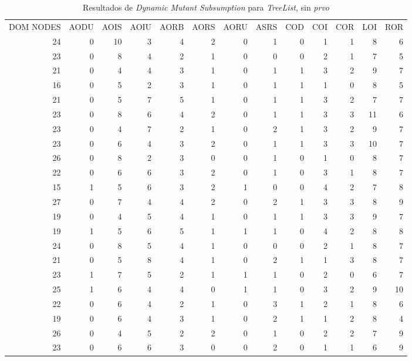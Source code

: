 \begin{table}[]
	\caption{Resultados de \emph{Dynamic Mutant Subsumption} para \emph{TreeList}, sin \emph{prvo}}
	\label{tables.results.subsumption.treelist.noprvo}
	\centering
	\scriptsize
	\def\arraystretch{0.95}
	\setlength\tabcolsep{0.5mm}
	\begin{tabular}{rrrrrrrrrrrrr}
		DOM NODES & AODU & AOIS & AOIU & AORB & AORS & AORU & ASRS & COD & COI & COR & LOI & ROR \\
		24 & 0 & 10 & 3 & 4 & 2 & 0 & 1 & 0 & 1 & 1 & 8 & 6 \\
		23 & 0 & 8 & 4 & 2 & 1 & 0 & 0 & 0 & 2 & 1 & 7 & 5 \\
		21 & 0 & 4 & 4 & 3 & 1 & 0 & 1 & 1 & 3 & 2 & 9 & 7 \\
		16 & 0 & 5 & 2 & 3 & 1 & 0 & 1 & 1 & 1 & 0 & 8 & 5 \\
		21 & 0 & 5 & 7 & 5 & 1 & 0 & 1 & 1 & 3 & 2 & 7 & 7 \\
		23 & 0 & 8 & 6 & 4 & 2 & 0 & 1 & 1 & 3 & 3 & 11 & 6 \\
		23 & 0 & 4 & 7 & 2 & 1 & 0 & 2 & 1 & 3 & 2 & 9 & 7 \\
		23 & 0 & 6 & 4 & 3 & 2 & 0 & 1 & 1 & 3 & 3 & 10 & 7 \\
		26 & 0 & 8 & 2 & 3 & 0 & 0 & 1 & 0 & 1 & 0 & 8 & 7 \\
		22 & 0 & 6 & 6 & 3 & 2 & 0 & 1 & 0 & 3 & 1 & 8 & 7 \\
		15 & 1 & 5 & 6 & 3 & 2 & 1 & 0 & 0 & 4 & 2 & 7 & 8 \\
		27 & 0 & 7 & 4 & 4 & 2 & 0 & 2 & 1 & 3 & 3 & 8 & 9 \\
		19 & 0 & 4 & 5 & 4 & 1 & 0 & 1 & 1 & 3 & 3 & 9 & 7 \\
		19 & 1 & 5 & 6 & 5 & 1 & 1 & 1 & 0 & 4 & 2 & 8 & 8 \\
		24 & 0 & 8 & 5 & 4 & 1 & 0 & 0 & 0 & 2 & 1 & 8 & 7 \\
		21 & 0 & 5 & 8 & 4 & 1 & 0 & 2 & 1 & 1 & 3 & 8 & 7 \\
		23 & 1 & 7 & 5 & 2 & 1 & 1 & 1 & 0 & 2 & 0 & 6 & 7 \\
		25 & 1 & 6 & 4 & 4 & 0 & 1 & 1 & 0 & 3 & 2 & 9 & 10 \\
		22 & 0 & 6 & 4 & 2 & 1 & 0 & 3 & 1 & 2 & 1 & 8 & 6 \\
		19 & 0 & 6 & 4 & 3 & 1 & 0 & 2 & 1 & 1 & 2 & 8 & 4 \\
		26 & 0 & 4 & 5 & 2 & 2 & 0 & 1 & 0 & 2 & 2 & 7 & 9 \\
		23 & 0 & 6 & 6 & 3 & 0 & 0 & 2 & 0 & 1 & 1 & 6 & 9 \\

\end{tabular}
\end{table}
